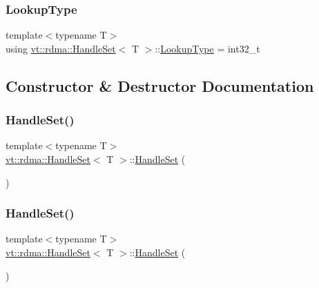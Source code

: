 \subsubsection{\texorpdfstring{Lookup\+Type}{LookupType}}
{\footnotesize\ttfamily template$<$typename T$>$ \\
using \hyperlink{structvt_1_1rdma_1_1_handle_set}{vt\+::rdma\+::\+Handle\+Set}$<$ T $>$\+::\hyperlink{structvt_1_1rdma_1_1_handle_set_a81d333ec397f0becb9fe692e53145441}{Lookup\+Type} =  int32\+\_\+t}



\subsection{Constructor \& Destructor Documentation}
\mbox{\label{structvt_1_1rdma_1_1_handle_set_a61565fe70c627c3fb0f68b3585610587}} 
\subsubsection{\texorpdfstring{Handle\+Set()}{HandleSet()}\hspace{0.1cm}{\footnotesize\ttfamily [1/3]}}
{\footnotesize\ttfamily template$<$typename T$>$ \\
\hyperlink{structvt_1_1rdma_1_1_handle_set}{vt\+::rdma\+::\+Handle\+Set}$<$ T $>$\+::\hyperlink{structvt_1_1rdma_1_1_handle_set}{Handle\+Set} (\begin{DoxyParamCaption}{ }\end{DoxyParamCaption})\hspace{0.3cm}{\ttfamily [default]}}

\mbox{\label{structvt_1_1rdma_1_1_handle_set_a831411511aa162e1539faa57552a2915}} 
\subsubsection{\texorpdfstring{Handle\+Set()}{HandleSet()}\hspace{0.1cm}{\footnotesize\ttfamily [2/3]}}
{\footnotesize\ttfamily template$<$typename T$>$ \\
\hyperlink{structvt_1_1rdma_1_1_handle_set}{vt\+::rdma\+::\+Handle\+Set}$<$ T $>$\+::\hyperlink{structvt_1_1rdma_1_1_handle_set}{Handle\+Set} (\begin{DoxyParamCaption}\item[{\hyperlink{structvt_1_1rdma_1_1_handle_set}{Handle\+Set}$<$ T $>$ const \&}]{ }\end{DoxyParamCaption})\hspace{0.3cm}{\ttfamily [default]}}

